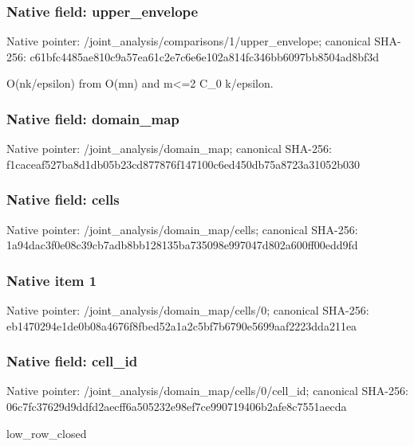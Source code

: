 \documentclass[10pt,a4paper]{article}
\begin{document}
\subsubsection{Native field: upper\_\allowbreak{}envelope}
Native pointer: /joint\_\allowbreak{}analysis/comparisons/1/upper\_\allowbreak{}envelope; canonical SHA-256: c61bfc4485ae810c9a57ea61c2e7c6e6e102a814fc346bb6097bb8504ad8bf3d

\begingroup\raggedright\sloppy O(nk/\allowbreak{}epsilon) from O(mn) and m<=\allowbreak{}2 C\_\allowbreak{}0 k/\allowbreak{}epsilon.\par\endgroup

\subsubsection{Native field: domain\_\allowbreak{}map}
Native pointer: /joint\_\allowbreak{}analysis/domain\_\allowbreak{}map; canonical SHA-256: f1caceaf527ba8d1db05b23cd877876f147100c6ed450db75a8723a31052b030

\subsubsection{Native field: cells}
Native pointer: /joint\_\allowbreak{}analysis/domain\_\allowbreak{}map/cells; canonical SHA-256: 1a94dac3f0e08c39cb7adb8bb128135ba735098e997047d802a600ff00edd9fd

\subsubsection{Native item 1}
Native pointer: /joint\_\allowbreak{}analysis/domain\_\allowbreak{}map/cells/0; canonical SHA-256: eb1470294e1de0b08a4676f8fbed52a1a2c5bf7b6790e5699aaf2223dda211ea

\subsubsection{Native field: cell\_\allowbreak{}id}
Native pointer: /joint\_\allowbreak{}analysis/domain\_\allowbreak{}map/cells/0/cell\_\allowbreak{}id; canonical SHA-256: 06c7fc37629d9ddfd2aecff6a505232e98ef7ce990719406b2afe8c7551aecda

\begingroup\raggedright\sloppy low\_\allowbreak{}row\_\allowbreak{}closed\par\endgroup
\end{document}
